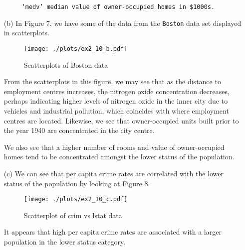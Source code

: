 \begin{itemize}
\begin{verbatim}
     ‘medv’ median value of owner-occupied homes in $1000s.
    \end{verbatim}
    \item[(b)] In Figure 7, we have some of the data from the \verb|Boston| data
    set displayed in scatterplots.\par
    \begin{figure}[!ht]
        \texttt{[image: ./plots/ex2\_10\_b.pdf]}
        \caption{Scatterplots of Boston data}
    \end{figure}
    \qquad From the scatterplots in this figure, we may see that as the distance to 
    employment centres increases, the nitrogen oxide concentration decreases,
    perhaps indicating higher levels of nitrogen oxide in the inner city due
    to vehicles and industrial pollution, which coincides with where employment
    centres are located. Likewise, we see that owner-occupied units built prior
    to the year 1940 are concentrated in the city centre.\par
    \qquad We also see that a higher number of rooms and value of owner-occupied 
    homes tend to be concentrated amongst the lower status of the population.
    \item[(c)] We can see that per capita crime rates are correlated with the
    lower status of the population by looking at Figure 8.
    \begin{figure}[!ht]
        \texttt{[image: ./plots/ex2\_10\_c.pdf]}
        \caption{Scatterplot of crim vs lstat data}
    \end{figure}
    It appears that high per capita crime rates are associated with a 
    larger population in the lower status category.
\end{itemize}
